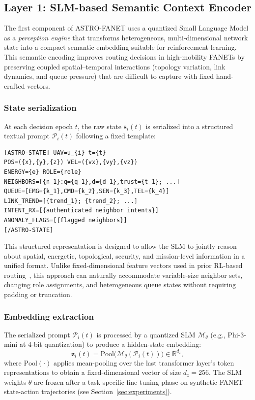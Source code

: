 \documentclass[5p,times]{elsarticle}
\begin{document}
\subsection{Layer 1: SLM-based Semantic Context Encoder}
\label{subsec:slm_encoder}

The first component of ASTRO-FANET uses a quantized Small Language Model as a \emph{perception engine} that transforms heterogeneous, multi-dimensional network state into a compact semantic embedding suitable for reinforcement learning.
This semantic encoding improves routing decisions in high-mobility FANETs by preserving coupled spatial--temporal interactions (topology variation, link dynamics, and queue pressure) that are difficult to capture with fixed hand-crafted vectors.

\subsubsection{State serialization}

At each decision epoch $t$, the raw state $\mathbf{s}_i(t)$ is serialized into a structured textual prompt $\mathcal{P}_i(t)$ following a fixed template:

\begin{lstlisting}[caption={State prompt template for the SLM encoder.},label={lst:prompt}]
[ASTRO-STATE] UAV=u_{i} t={t}
POS=({x},{y},{z}) VEL=({vx},{vy},{vz})
ENERGY={e} ROLE={role}
NEIGHBORS=[{n_1}:q={q_1},d={d_1},trust={t_1}; ...]
QUEUE=[EMG={k_1},CMD={k_2},SEN={k_3},TEL={k_4}]
LINK_TREND=[{trend_1}; {trend_2}; ...]
INTENT_RX=[{authenticated neighbor intents}]
ANOMALY_FLAGS=[{flagged neighbors}]
[/ASTRO-STATE]
\end{lstlisting}

This structured representation is designed to allow the SLM to jointly reason about spatial, energetic, topological, security, and mission-level information in a unified format. Unlike fixed-dimensional feature vectors used in prior RL-based routing~\cite{liu2019rl_routing,wang2023drl_fanet}, this approach can naturally accommodate variable-size neighbor sets, changing role assignments, and heterogeneous queue states without requiring padding or truncation.

\subsubsection{Embedding extraction}

The serialized prompt $\mathcal{P}_i(t)$ is processed by a quantized SLM $\mathcal{M}_{\theta}$ (e.g., Phi-3-mini at 4-bit quantization) to produce a hidden-state embedding:
\begin{equation}
\label{eq:slm_embedding}
\mathbf{z}_i(t) = \text{Pool}\big(\mathcal{M}_{\theta}(\mathcal{P}_i(t))\big) \in \mathbb{R}^{d_z},
\end{equation}
where $\text{Pool}(\cdot)$ applies mean-pooling over the last transformer layer's token representations to obtain a fixed-dimensional vector of size $d_z = 256$. The SLM weights $\theta$ are frozen after a task-specific fine-tuning phase on synthetic FANET state-action trajectories (see Section~\ref{sec:experiments}).
\end{document}
